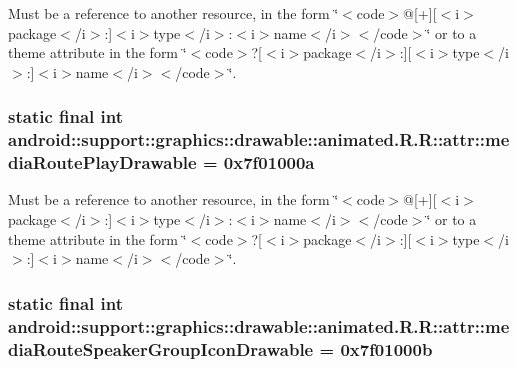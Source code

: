 Must be a reference to another resource, in the form \char`\"{}$<$code$>$@\mbox{[}+\mbox{]}\mbox{[}$<$i$>$package$<$/i$>$:\mbox{]}$<$i$>$type$<$/i$>$:$<$i$>$name$<$/i$>$$<$/code$>$\char`\"{} or to a theme attribute in the form \char`\"{}$<$code$>$?\mbox{[}$<$i$>$package$<$/i$>$:\mbox{]}\mbox{[}$<$i$>$type$<$/i$>$:\mbox{]}$<$i$>$name$<$/i$>$$<$/code$>$\char`\"{}. \hypertarget{classandroid_1_1support_1_1graphics_1_1drawable_1_1animated_1_1_r_1_1attr_a8d5f9f636ec6073fbd5489f1198111b}{
\subsubsection[{mediaRoutePlayDrawable}]{\setlength{\rightskip}{0pt plus 5cm}static final int android::support::graphics::drawable::animated.R.R::attr::mediaRoutePlayDrawable = 0x7f01000a}}
\label{classandroid_1_1support_1_1graphics_1_1drawable_1_1animated_1_1_r_1_1attr_a8d5f9f636ec6073fbd5489f1198111b}


Must be a reference to another resource, in the form \char`\"{}$<$code$>$@\mbox{[}+\mbox{]}\mbox{[}$<$i$>$package$<$/i$>$:\mbox{]}$<$i$>$type$<$/i$>$:$<$i$>$name$<$/i$>$$<$/code$>$\char`\"{} or to a theme attribute in the form \char`\"{}$<$code$>$?\mbox{[}$<$i$>$package$<$/i$>$:\mbox{]}\mbox{[}$<$i$>$type$<$/i$>$:\mbox{]}$<$i$>$name$<$/i$>$$<$/code$>$\char`\"{}. \hypertarget{classandroid_1_1support_1_1graphics_1_1drawable_1_1animated_1_1_r_1_1attr_70cb1b33d3c0a171ff2ad79a16b31d7f}{
\subsubsection[{mediaRouteSpeakerGroupIconDrawable}]{\setlength{\rightskip}{0pt plus 5cm}static final int android::support::graphics::drawable::animated.R.R::attr::mediaRouteSpeakerGroupIconDrawable = 0x7f01000b}}
\label{classandroid_1_1support_1_1graphics_1_1drawable_1_1animated_1_1_r_1_1attr_70cb1b33d3c0a171ff2ad79a16b31d7f}


